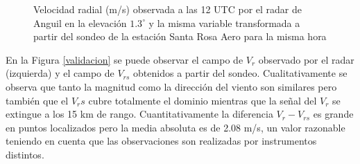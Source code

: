\documentclass[12pt,spanish,oneside]{book}
\begin{document}
\begin{figure}
\newline{}\caption{Velocidad radial (m/s) observada a las 12 UTC por el radar de Anguil en la elevación $1.3^{\circ}$ y la misma variable transformada a partir del sondeo de la estación Santa Rosa Aero para la misma hora \label{validacion}}\label{fig:validacion}
\end{figure}

En la Figura \ref{validacion} se puede observar el campo de \(V_r\)
observado por el radar (izquierda) y el campo de \(V_{rs}\) obtenidos a
partir del sondeo. Cualitativamente se observa que tanto la magnitud
como la dirección del viento son similares pero también que el \(V_rs\)
cubre totalmente el dominio mientras que la señal del \(V_r\) se
extingue a los 15 km de rango. Cuantitativamente la diferencia
\(V_r - V_{rs}\) es grande en puntos localizados pero la media absoluta
es de 2.08 m/s, un valor razonable teniendo en cuenta que las
observaciones son realizadas por instrumentos distintos.
\end{document}

